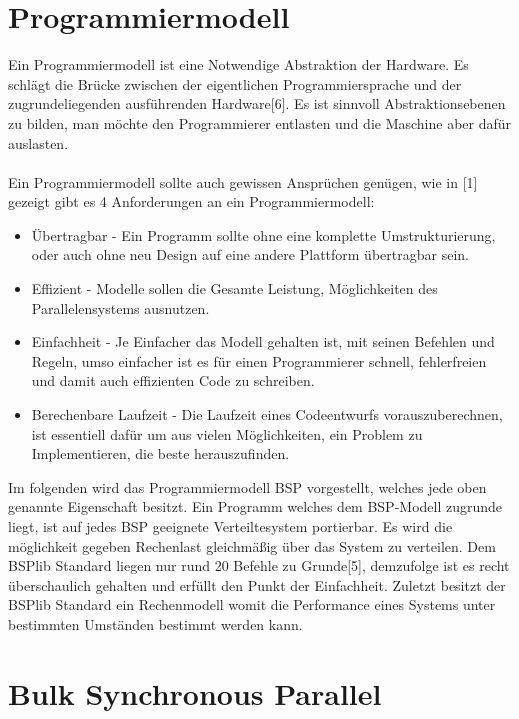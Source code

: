 \documentclass[a4paper,10pt]{scrartcl}
\begin{document}
\section{Programmiermodell}
Ein Programmiermodell ist eine Notwendige Abstraktion der Hardware. Es schlägt die Brücke zwischen der eigentlichen Programmiersprache und der zugrundeliegenden ausführenden Hardware[6]. Es ist sinnvoll Abstraktionsebenen zu bilden, man möchte den Programmierer entlasten und die Maschine aber dafür auslasten.
\\
\\
Ein Programmiermodell sollte auch gewissen Ansprüchen genügen, wie in [1] gezeigt gibt es 4 Anforderungen an ein Programmiermodell:
\begin{itemize}
\item Übertragbar - Ein Programm sollte ohne eine komplette Umstrukturierung, oder auch ohne neu Design auf eine andere Plattform übertragbar sein.
\item Effizient - Modelle sollen die Gesamte Leistung, Möglichkeiten des Parallelensystems ausnutzen.
\item Einfachheit - Je Einfacher das Modell gehalten ist, mit seinen Befehlen und Regeln, umso einfacher ist es für einen Programmierer schnell, fehlerfreien und damit auch effizienten Code zu schreiben.
\item Berechenbare Laufzeit - Die Laufzeit eines Codeentwurfs vorauszuberechnen, ist essentiell dafür um aus vielen Möglichkeiten, ein Problem zu Implementieren, die beste herauszufinden.
\end{itemize}
Im folgenden wird das Programmiermodell BSP vorgestellt, welches jede oben genannte Eigenschaft besitzt. Ein Programm welches dem BSP-Modell zugrunde liegt, ist auf jedes BSP geeignete Verteiltesystem portierbar. Es wird die möglichkeit gegeben Rechenlast gleichmäßig über das System zu verteilen. Dem BSPlib Standard liegen nur rund 20 Befehle zu Grunde[5], demzufolge ist es recht überschaulich gehalten und erfüllt den Punkt der Einfachheit. Zuletzt besitzt der BSPlib Standard ein Rechenmodell womit die Performance eines Systems unter bestimmten Umständen bestimmt werden kann.
\newpage
 
\section{Bulk Synchronous Parallel}
\end{document}
